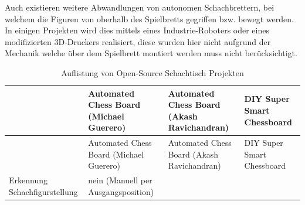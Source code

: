 Auch existieren weitere Abwandlungen von autonomen Schachbrettern, bei
welchem die Figuren von oberhalb des Spielbretts gegriffen bzw. bewegt
werden. In einigen Projekten wird dies mittels eines Industrie-Roboters
\autocite{actprojectrobot} oder eines modifizierten
3D-Druckers\autocite{atcproject3dprinter} realisiert, diese wurden hier
nicht aufgrund der Mechanik welche über dem Spielbrett montiert werden
muss nicht berücksichtigt.

\begin{longtable}[]{@{}llll@{}}
\caption{Auflistung von Open-Source Schachtisch
Projekten}\tabularnewline
\toprule
\begin{minipage}[b]{0.20\columnwidth}\raggedright
\strut
\end{minipage} & \begin{minipage}[b]{0.24\columnwidth}\raggedright
Automated Chess Board (Michael Guerero) \autocite{actproject1}\strut
\end{minipage} & \begin{minipage}[b]{0.26\columnwidth}\raggedright
Automated Chess Board (Akash Ravichandran) \autocite{actproject2}\strut
\end{minipage} & \begin{minipage}[b]{0.19\columnwidth}\raggedright
DIY Super Smart Chessboard \autocite{actproject3}\strut
\end{minipage}\tabularnewline
\midrule
\endfirsthead
\toprule
\begin{minipage}[b]{0.20\columnwidth}\raggedright
\strut
\end{minipage} & \begin{minipage}[b]{0.24\columnwidth}\raggedright
Automated Chess Board (Michael Guerero) \autocite{actproject1}\strut
\end{minipage} & \begin{minipage}[b]{0.26\columnwidth}\raggedright
Automated Chess Board (Akash Ravichandran) \autocite{actproject2}\strut
\end{minipage} & \begin{minipage}[b]{0.19\columnwidth}\raggedright
DIY Super Smart Chessboard \autocite{actproject3}\strut
\end{minipage}\tabularnewline
\midrule
\endhead
\begin{minipage}[t]{0.20\columnwidth}\raggedright
Erkennung Schachfigurstellung\strut
\end{minipage} & \begin{minipage}[t]{0.24\columnwidth}\raggedright
nein (Manuell per Ausgangsposition)\strut

\end{minipage}
\end{longtable}
